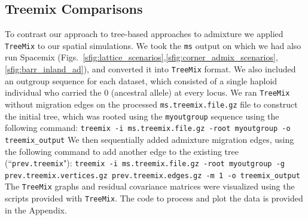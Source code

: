 \documentclass[10pt,letterpaper]{article}
\begin{document}
\subsection*{Treemix Comparisons}
To contrast our approach to tree-based approaches to admixture we
applied \texttt{TreeMix} \cite{Treemix} to our spatial simulations.
%
We took the \texttt{ms} output on which we had also run Spacemix 
(Figs.\ \ref{sfig:lattice_scenarios},\ref{sfig:corner_admix_scenarios},\ref{sfig:barr_inland_ad}), 
and converted it into \texttt{TreeMix} format.  
We also included an outgroup sequence for each dataset,
 which consisted of a single haploid individual who carried the $0$ (ancestral allele) at every locus. 
 We ran \texttt{TreeMix} without migration edges on the processed \texttt{ms.treemix.file.gz} file to construct the initial
tree, which was rooted using the \texttt{myoutgroup} sequence using the following command:
\hspace*{\fill}\newline\hspace*{\fill}\newline
\texttt{treemix -i ms.treemix.file.gz  -root myoutgroup -o treemix\_output}
\hspace*{\fill}\newline\hspace*{\fill}\newline
We then sequentially added admixture migration edges, 
using the following command to add another edge to the existing tree (``\texttt{prev.treemix}"):
\hspace*{\fill}\newline\hspace*{\fill}\newline
\texttt{treemix -i  ms.treemix.file.gz -root myoutgroup  -g  prev.treemix.vertices.gz  prev.treemix.edges.gz -m 1 -o  treemix\_output}
\hspace*{\fill}\newline\hspace*{\fill}\newline
The \texttt{TreeMix} graphs and residual covariance matrices were visualized
using the scripts provided with \texttt{TreeMix}. 
The code to process and plot the data is provided in the Appendix.\\
\end{document}
